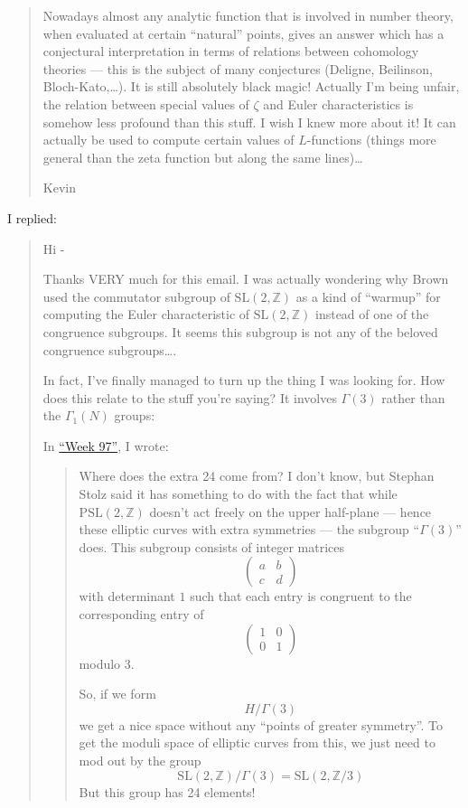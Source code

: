 \documentclass{article}
\begin{document}
\begin{quote}
Nowadays almost any analytic function that is involved in number theory,
when evaluated at certain ``natural'' points, gives an answer which has
a conjectural interpretation in terms of relations between cohomology
theories --- this is the subject of many conjectures (Deligne,
Beilinson, Bloch-Kato,\ldots). It is still absolutely black magic!
Actually I'm being unfair, the relation between special values of
\(\zeta\) and Euler characteristics is somehow less profound than this
stuff. I wish I knew more about it! It can actually be used to compute
certain values of \(L\)-functions (things more general than the zeta
function but along the same lines)\ldots{}

Kevin
\end{quote}

I replied:

\begin{quote}
Hi -

Thanks VERY much for this email. I was actually wondering why Brown used
the commutator subgroup of \(\mathrm{SL}(2,\mathbb{Z})\) as a kind of
``warmup'' for computing the Euler characteristic of
\(\mathrm{SL}(2,\mathbb{Z})\) instead of one of the congruence
subgroups. It seems this subgroup is not any of the beloved congruence
subgroups\ldots.

In fact, I've finally managed to turn up the thing I was looking for.
How does this relate to the stuff you're saying? It involves
\(\Gamma(3)\) rather than the \(\Gamma_1(N)\) groups:

In \protect\hyperlink{weekux5cux252097}{``Week 97''}, I wrote:

\begin{quote}
Where does the extra 24 come from? I don't know, but Stephan Stolz said
it has something to do with the fact that while
\(\mathrm{PSL}(2,\mathbb{Z})\) doesn't act freely on the upper
half-plane --- hence these elliptic curves with extra symmetries --- the
subgroup ``\(\Gamma(3)\)'' does. This subgroup consists of integer
matrices \[\left(\begin{array}{cc}a&b\\c&d\end{array}\right)\] with
determinant \(1\) such that each entry is congruent to the corresponding
entry of \[\left(\begin{array}{cc}1&0\\0&1\end{array}\right)\] modulo 3.

So, if we form \[H/\Gamma(3)\] we get a nice space without any ``points
of greater symmetry''. To get the moduli space of elliptic curves from
this, we just need to mod out by the group
\[\mathrm{SL}(2,\mathbb{Z})/\Gamma(3) = \mathrm{SL}(2,\mathbb{Z}/3)\]
But this group has 24 elements!


\end{quote}
\end{quote}
\end{document}
